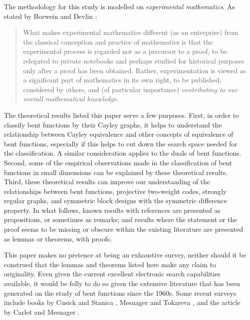 The methodology for this study is modelled on \emph{experimental mathematics}.
As stated by Borwein and Devlin \cite[pp. 4-5]{BorD2008}:
\begin{quotation}
What makes experimental mathematics different (as an enterprise)
from the classical conception and practice of mathematics is that the
experimental process is regarded not as a precursor to a proof, to be
relegated to private notebooks and perhaps studied for historical
purposes only after a proof has been obtained. Rather, experimentation
is viewed as a significant part of mathematics in its own right, to
be published, considered by others, and (of particular importance)
\emph{contributing to our overall mathematical knowledge.}
\end{quotation}

The theoretical results listed this paper serve a few purposes.
First, in order to classify bent functions by their Cayley graphs,
it helps to understand the relationship between Cayley equivalence and other concepts of equivalence
of bent functions, especially if this helps to cut down the search space needed for the
classification.
A similar consideration applies to the duals of bent functions.
Second, some of the empirical observations made in the classification of bent functions in small
dimensions can be explained by these theoretical results.
Third, these theoretical results can improve our understanding of the relationships between
bent functions, projective two-weight codes, strongly regular graphs, and
symmetric block designs with the symmetric difference property.
In what follows, known results with references are presented as propositions, or sometimes as remarks;
and results where the statement or the proof seems to be missing or obscure within the existing literature
are presented as lemmas or theorems, with proofs.

This paper makes no pretence at being an exhaustive survey, neither should it be construed that
the lemmas and theorems listed here make any claim to originality.
Even given the current excellent electronic search capabilities available, it would be folly to do so given
the extensive literature that has been generated on the study of bent functions since the 1960s.
Some recent surveys include books by Cusick and Stanica \cite{CusS2017},
Mesnager \cite{Mes2016} and Tokareva \cite{Tok15bent},
and the article by Carlet and Mesnager \cite{CarM2016four}.

